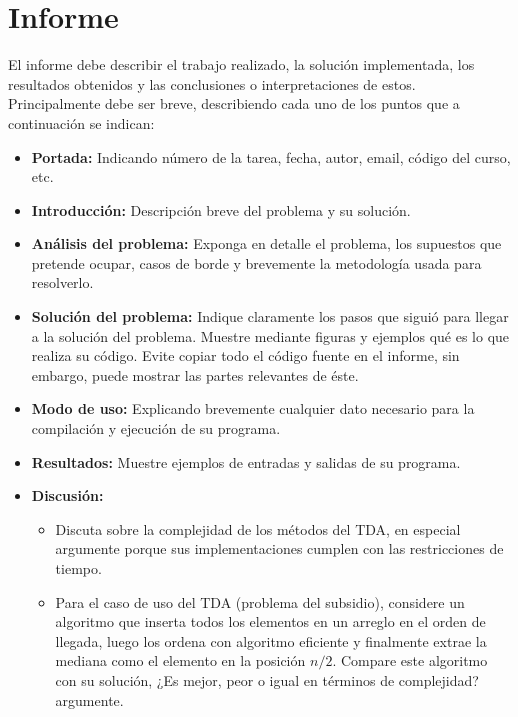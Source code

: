 \documentclass[dcc]{fcfmcourse}
\begin{document}
\newpage
\section{Informe}

El informe debe describir el trabajo realizado, la solución implementada, los resultados obtenidos
y las conclusiones o interpretaciones de estos. Principalmente debe ser breve, describiendo cada uno
de los puntos que a continuación se indican:

\begin{itemize}
    \item \textbf{Portada:} Indicando número de la tarea, fecha, autor, email, código del curso, etc.
    \item \textbf{Introducción:} Descripción breve del problema y su solución.
    \item \textbf{Análisis del problema:} Exponga en detalle el problema, los supuestos que pretende ocupar, casos de borde y brevemente la metodología usada para resolverlo.
    \item \textbf{Solución del problema:} Indique claramente los pasos que siguió para llegar a la solución
del problema. Muestre mediante figuras y ejemplos qué es lo que realiza su código. Evite
copiar todo el código fuente en el informe, sin embargo, puede mostrar las partes relevantes
de éste.
\item \textbf{Modo de uso:} Explicando brevemente cualquier dato necesario para la compilación y
ejecución de su programa.
\item \textbf{Resultados:} Muestre ejemplos de entradas y salidas de su programa.
\item \textbf{Discusión:} 
\begin{itemize}
    \item Discuta sobre la complejidad de los métodos del TDA, en especial argumente porque sus implementaciones cumplen con las restricciones de tiempo. 
    \item Para el caso de uso del TDA (problema del subsidio), considere un algoritmo que inserta todos los elementos en un arreglo en el orden de llegada, luego los ordena con algoritmo eficiente y finalmente extrae la mediana como el elemento en la posición $n/2$. Compare este algoritmo con su solución, ¿Es mejor, peor o igual en términos de complejidad? argumente.
\end{itemize}



\end{itemize}
\end{document}
